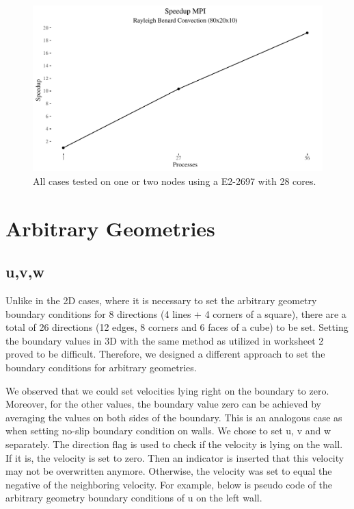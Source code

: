 \documentclass{article}%
\begin{document}
\begin{figure}[htbp]
\centering
\includegraphics[width=1\linewidth]{../tests/graphs/speedup_MPI.pdf}
\caption{All cases tested on one or two nodes using a E2-2697 with 28 cores.}
\label{fig:speedup_MPI}
\end{figure}


\section{Arbitrary Geometries}
\subsection{u,v,w}

Unlike in the 2D cases, where it is necessary to set the arbitrary geometry boundary conditions for 8 directions (4 lines + 4 corners of a square), there are a total of 26 directions (12 edges, 8 corners and 6 faces of a cube) to be set. Setting the boundary values in 3D with the same method as utilized in worksheet 2 proved to be difficult.  Therefore, we designed a different approach to set the boundary conditions for arbitrary geometries.

We observed that we could set velocities lying right on the boundary to zero. Moreover, for the other values, the boundary value zero can be achieved by averaging the values on both sides of the boundary. This is an analogous case as when setting no-slip boundary condition on walls. We chose to set u, v and w separately. The direction flag is used to check if the velocity is lying on the wall. If it is, the velocity is set to zero. Then an indicator is inserted that this velocity may not be overwritten anymore. Otherwise, the velocity was set to equal the negative of the neighboring velocity. For example, below is pseudo code of the arbitrary geometry boundary conditions of u on the left wall.
\end{document}
